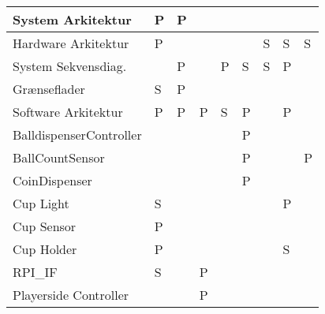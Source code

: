 \documentclass[Rapport/Rapport_main.tex]{subfiles}
\begin{document}
\begin{longtable}{|L{0.2\textwidth}|L{0.082\textwidth}|L{0.08\textwidth}|L{0.08\textwidth}|L{0.08\textwidth}|L{0.08\textwidth}|L{0.08\textwidth}|L{0.08\textwidth}|L{0.08\textwidth}|}
        System Arkitektur       &       P       &       P       &               &               &               &               &               &                \\ \hline
        Hardware Arkitektur     &       P       &               &               &               &               &       S       &       S       &       S        \\ \hline
        System Sekvensdiag.     &               &       P       &               &       P       &       S       &       S       &       P       &                \\ \hline
        Grænseflader            &       S       &       P       &               &               &               &               &               &                \\ \hline
        Software Arkitektur     &       P       &       P       &       P       &       S       &       P       &               &       P       &                \\ \hline
        BalldispenserController &               &               &               &               &       P       &               &               &                \\ \hline
        BallCountSensor         &               &               &               &               &       P       &               &               &       P        \\ \hline
        CoinDispenser           &               &               &               &               &       P       &               &               &                \\ \hline
        Cup Light               &       S       &               &               &               &               &               &       P       &                \\ \hline
        Cup Sensor              &       P       &               &               &               &               &               &               &                \\ \hline
        Cup Holder              &       P       &               &               &               &               &               &       S       &                \\ \hline
        RPI\_IF                 &       S       &               &       P       &               &               &               &               &                \\ \hline
        Playerside Controller   &               &               &       P       &               &               &               &               &                \\ \hline

\end{longtable}
\end{document}
